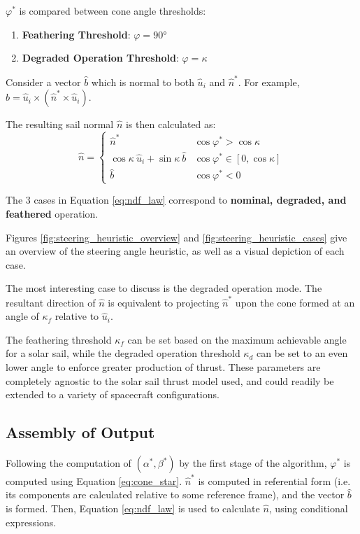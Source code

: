 $\varphi^*$ is compared between cone angle thresholds:
\begin{enumerate}
    \item \textbf{Feathering Threshold}: $\varphi = \ang{90}$
    \item \textbf{Degraded Operation Threshold}: $\varphi = \kappa$
\end{enumerate}

Consider a vector $\hat{b}$ which is normal to both $\hat{u}_i$ and $\hat{n}^*$. For example, $\hat{b} = \hat{u}_i \times (\hat{n}^* \times \hat{u}_i)$.

The resulting sail normal $\hat{n}$ is then calculated as:
\begin{equation}
    \hat{n} = \begin{cases}
        \hat{n}^*                                       & \cos \varphi^* > \cos \kappa          \\
        \cos \kappa \ \hat{u}_i + \sin \kappa \ \hat{b} & \cos \varphi^* \in  [ 0, \cos \kappa] \\
        \hat{b}                                         & \cos \varphi^* < 0
    \end{cases}
    \label{eq:ndf_law}
\end{equation}

The 3 cases in Equation \ref{eq:ndf_law} correspond to \textbf{nominal, degraded, and feathered} operation.




Figures \ref{fig:steering_heuristic_overview} and \ref{fig:steering_heuristic_cases} give an overview of the steering angle heuristic, as well as a visual depiction of each case.

The most interesting case to discuss is the degraded operation mode. The resultant direction of $\hat{n}$ is equivalent to projecting $\hat{n}^*$ upon the cone formed at an angle of $\kappa_f$ relative to $\hat{u}_i$.

The feathering threshold $\kappa_f$ can be set based on the maximum achievable angle for a solar sail, while the degraded operation threshold $\kappa_d$ can be set to an even lower angle to enforce greater production of thrust. These parameters are completely agnostic to the solar sail thrust model used, and could readily be extended to a variety of spacecraft configurations.

\subsection{Assembly of Output}
Following the computation of $(\alpha^*, \beta^*)$ by the first stage of the algorithm, $\varphi^*$ is computed using Equation \ref{eq:cone_star}. $\hat{n}^*$ is computed in referential form (i.e. its components are calculated relative to some reference frame), and the vector $\hat{b}$ is formed. Then, Equation \ref{eq:ndf_law} is used to calculate $\hat{n}$, using conditional expressions.

